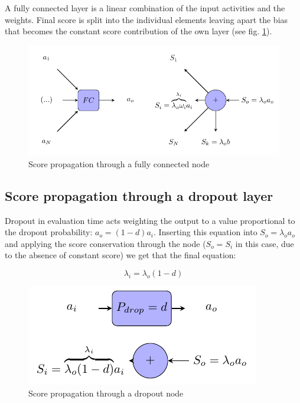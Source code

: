 \documentclass[preprint]{elsarticle}
\theoremstyle{definition} %
\theoremstyle{remark}
\begin{document}
A fully connected layer is a linear combination of the input activities and the weights. Final score is split into the individual elements leaving apart the bias that becomes the constant score contribution of the own layer (see fig. \ref{fig:score_fc}).

\begin{figure}[h!]
	\centering
	\includegraphics{figures/score_fc.pdf}
	\caption{Score propagation through a fully connected node}
	\label{fig:score_fc}
\end{figure}

\subsection{Score propagation through a dropout layer}

Dropout in evaluation time acts weighting the output to a value proportional to the dropout probability: $a_o = (1-d)a_i$. Inserting this equation into $S_o = \lambda_o a_o$ and applying the score conservation through the node ($S_o = S_i$ in this case, due to the absence of constant score) we get that the final equation:

\begin{equation}
 \lambda_i = \lambda_o (1-d)
\end{equation}

\begin{figure}[h!]
	\centering
	\includegraphics{figures/score_dropout.pdf}
	\caption{Score propagation through a dropout node}
	\label{fig:score_dropout}
\end{figure}
\end{document}
